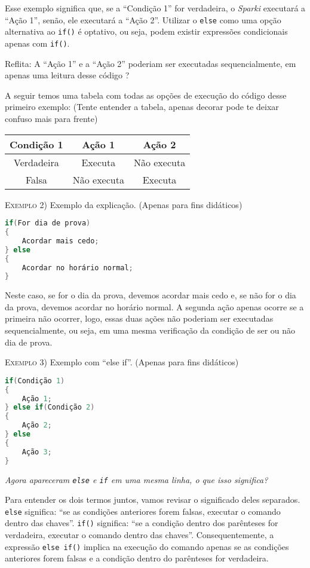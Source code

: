     Esse exemplo significa que, se a ``Condição 1'' for verdadeira, o \textsl{Sparki} executará a ``Ação 1'', senão, ele executará a ``Ação 2''. Utilizar o \lstinline[columns=fixed]{else} como uma opção alternativa ao \lstinline[columns=fixed]{if()} é optativo, ou seja, podem existir expressões condicionais apenas com \lstinline[columns=fixed]{if()}.
    
    \begin{center}
    {\large{Reflita}}: A ``Ação 1'' e a ``Ação 2'' poderiam ser executadas sequencialmente, em apenas uma leitura desse código ?
    \end{center}
    
    A seguir temos uma tabela com todas as opções de execução do código desse primeiro exemplo: (Tente entender a tabela, apenas decorar pode te deixar confuso mais para frente)
    
    \begin{center}
    \begin{tabular}{|c|c|c|}
    \hline
    Condição 1 & Ação 1 & Ação 2 \\ \hline
    Verdadeira & Executa & Não executa \\ \hline
    Falsa & Não executa & Executa \\ \hline
    \end{tabular}
    \end{center}
    
    \textsc{Exemplo 2)} Exemplo da explicação. (Apenas para fins didáticos)
    
\begin{lstlisting}[language=C]
if(For dia de prova) 
{
    Acordar mais cedo;
} else 
{
    Acordar no horário normal;
}
\end{lstlisting}
    
    Neste caso, se for o dia da prova, devemos acordar mais cedo e, se não for o dia da prova, devemos acordar no horário normal. A segunda ação apenas ocorre se a primeira não ocorrer, logo, essas duas ações não poderiam ser executadas sequencialmente, ou seja, em uma mesma verificação da condição de ser ou não dia de prova.

    \textsc{Exemplo 3)} Exemplo com ``else if''. (Apenas para fins didáticos)
    \begin{lstlisting}[language=C]
if(Condição 1)
{
    Ação 1;
} else if(Condição 2)
{
    Ação 2;
} else
{
    Ação 3;
}
\end{lstlisting}
    
    \textit{Agora apareceram \lstinline[columns=fixed]{else} e \lstinline[columns=fixed]{if} em uma mesma linha, o que isso significa?} \par
    Para entender os dois termos juntos, vamos revisar o significado deles separados. \lstinline[columns=fixed]{else} significa: ``se as condições anteriores forem falsas, executar o comando dentro das chaves''. \lstinline[columns=fixed]{if()} significa: ``se a condição dentro dos parênteses for verdadeira, executar o comando dentro das chaves''. Consequentemente, a expressão \lstinline[columns=fixed]{else if()} implica na execução do comando apenas se as condições anteriores forem falsas e a condição dentro do parênteses for verdadeira.
    
